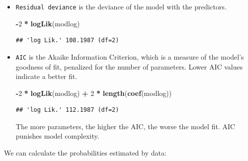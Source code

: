 \documentclass[
]{article}
\newenvironment{Shaded}{\begin{snugshade}}{\end{snugshade}}
\newcommand{\AttributeTok}[1]{\textcolor[rgb]{0.13,0.29,0.53}{#1}}
\newcommand{\DecValTok}[1]{\textcolor[rgb]{0.00,0.00,0.81}{#1}}
\newcommand{\FunctionTok}[1]{\textcolor[rgb]{0.13,0.29,0.53}{\textbf{#1}}}
\newcommand{\NormalTok}[1]{#1}
\newcommand{\SpecialCharTok}[1]{\textcolor[rgb]{0.81,0.36,0.00}{\textbf{#1}}}
\newcommand{\StringTok}[1]{\textcolor[rgb]{0.31,0.60,0.02}{#1}}
\begin{document}
\begin{itemize}
\begin{Shaded}
\begin{Highlighting}[]
\SpecialCharTok{{-}}\DecValTok{2} \SpecialCharTok{*} \FunctionTok{logLik}\NormalTok{(}\FunctionTok{glm}\NormalTok{(y }\SpecialCharTok{\textasciitilde{}} \DecValTok{1}\NormalTok{, }\AttributeTok{family =} \FunctionTok{binomial}\NormalTok{(}\AttributeTok{link =} \StringTok{"logit"}\NormalTok{)))}
\end{Highlighting}
\end{Shaded}

\begin{verbatim}
## 'log Lik.' 137.6278 (df=1)
\end{verbatim}
\item
  \texttt{Residual\ deviance} is the deviance of the model with the
  predictors.

\begin{Shaded}
\begin{Highlighting}[]
 \SpecialCharTok{{-}}\DecValTok{2} \SpecialCharTok{*} \FunctionTok{logLik}\NormalTok{(modlog)}
\end{Highlighting}
\end{Shaded}

\begin{verbatim}
## 'log Lik.' 108.1987 (df=2)
\end{verbatim}
\item
  \texttt{AIC} is the Akaike Information Criterion, which is a measure
  of the model's goodness of fit, penalized for the number of
  parameters. Lower AIC values indicate a better fit.

\begin{Shaded}
\begin{Highlighting}[]
\SpecialCharTok{{-}}\DecValTok{2} \SpecialCharTok{*} \FunctionTok{logLik}\NormalTok{(modlog) }\SpecialCharTok{+} \DecValTok{2} \SpecialCharTok{*} \FunctionTok{length}\NormalTok{(}\FunctionTok{coef}\NormalTok{(modlog))}
\end{Highlighting}
\end{Shaded}

\begin{verbatim}
## 'log Lik.' 112.1987 (df=2)
\end{verbatim}

  The more parameters, the higher the AIC, the worse the model fit. AIC
  punishes model complexity.
\end{itemize}

We can calculate the probabilities estimated by data:
\end{document}
